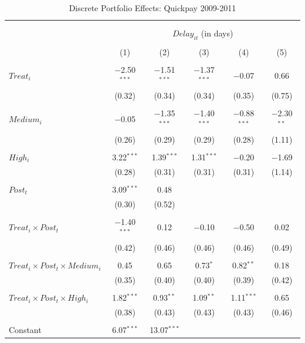 \documentclass[
]{article}
\begin{document}
\begin{table}[H] \centering 
  \caption{Discrete Portfolio Effects: Quickpay 2009-2011} 
  \label{} 
\small 
\begin{tabular}{@{\extracolsep{-2pt}}lccccc} 
\\[-1.8ex]\hline 
\hline \\[-1.8ex] 
\\[-1.8ex] & \multicolumn{5}{c}{$Delay_{it}$ (in days)} \\ 
\\[-1.8ex] & (1) & (2) & (3) & (4) & (5)\\ 
\hline \\[-1.8ex] 
 $Treat_i$ & $-$2.50$^{***}$ & $-$1.51$^{***}$ & $-$1.37$^{***}$ & $-$0.07 & 0.66 \\ 
  & (0.32) & (0.34) & (0.34) & (0.35) & (0.75) \\ 
  & & & & & \\ 
 $Medium_i$ & $-$0.05 & $-$1.35$^{***}$ & $-$1.40$^{***}$ & $-$0.88$^{***}$ & $-$2.30$^{**}$ \\ 
  & (0.26) & (0.29) & (0.29) & (0.28) & (1.11) \\ 
  & & & & & \\ 
 $High_i$ & 3.22$^{***}$ & 1.39$^{***}$ & 1.31$^{***}$ & $-$0.20 & $-$1.69 \\ 
  & (0.28) & (0.31) & (0.31) & (0.31) & (1.14) \\ 
  & & & & & \\ 
 $Post_t$ & 3.09$^{***}$ & 0.48 &  &  &  \\ 
  & (0.30) & (0.52) &  &  &  \\ 
  & & & & & \\ 
 $Treat_i \times Post_t$ & $-$1.40$^{***}$ & 0.12 & $-$0.10 & $-$0.50 & 0.02 \\ 
  & (0.42) & (0.46) & (0.46) & (0.46) & (0.49) \\ 
  & & & & & \\ 
 $Treat_i \times Post_t \times Medium_i$ & 0.45 & 0.65 & 0.73$^{*}$ & 0.82$^{**}$ & 0.18 \\ 
  & (0.35) & (0.40) & (0.40) & (0.39) & (0.42) \\ 
  & & & & & \\ 
 $Treat_i \times Post_t \times High_i$ & 1.82$^{***}$ & 0.93$^{**}$ & 1.09$^{**}$ & 1.11$^{***}$ & 0.65 \\ 
  & (0.38) & (0.43) & (0.43) & (0.43) & (0.46) \\ 
  & & & & & \\ 
 Constant & 6.07$^{***}$ & 13.07$^{***}$ &  &  &  \\ 

\end{tabular}
\end{table}
\end{document}
